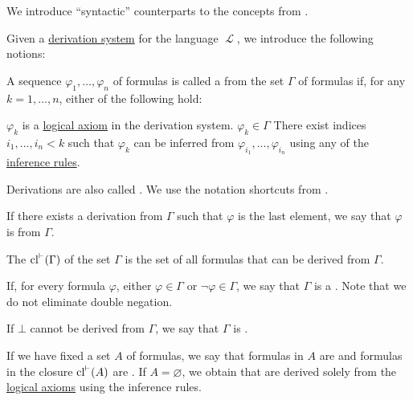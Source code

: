 \begin{definition}\label{def:first_order_proofs}
  We introduce \enquote{syntactic} counterparts to the concepts from .

  Given a \hyperref[def:first_order_derivation_system]{derivation system} for the language \( \mscrL \), we introduce the following notions:
  \begin{thmenum}
    \mcite\cite[def. 12.1]{OpenLogic20201202}A sequence \( \varphi_1, \ldots, \varphi_n \) of formulas is called a  from the set \( \Gamma \) of formulas if, for any \( k = 1, \ldots, n \), either of the following hold:
    \begin{thmenum}
       \( \varphi_k \) is a \hyperref[def:first_order_derivation_system/axioms]{logical axiom} in the derivation system.
       \( \varphi_k \in \Gamma \)
       There exist indices \( i_1, \ldots, i_n < k \) such that \( \varphi_k \) can be inferred from \( \varphi_{i_1}, \ldots, \varphi_{i_n} \) using any of the \hyperref[def:first_order_derivation_system/rules]{inference rules}.
    \end{thmenum}

    Derivations are also called . We use the notation shortcuts from .

     If there exists a derivation from \( \Gamma \) such that \( \varphi \) is the last element, we say that \( \varphi \) is  from \( \Gamma \).

     The  \( \operatorname{cl}^{\vdash}(\Gamma) \) of the set \( \Gamma \) is the set of all formulas that can be derived from \( \Gamma \).

    \mcite\cite[def. 13.1]{OpenLogic20201202}If, for every formula \( \varphi \), either \( \varphi \in \Gamma \) or \( \neg \varphi \in \Gamma \), we say that \( \Gamma \) is a . Note that we do not eliminate double negation.

    \mcite\cite[def. 20.16]{OpenLogic20201202}If \( \bot \) cannot be derived from \( \Gamma \), we say that \( \Gamma \) is .

     If we have fixed a set \( A \) of formulas, we say that formulas in \( A \) are  and formulas in the closure \( \operatorname{cl}^{\vdash}(A) \) are . If \( A = \varnothing \), we obtain  that are derived solely from the \hyperref[def:first_order_derivation_system/axioms]{logical axioms} using the inference rules.
  \end{thmenum}
\end{definition}

